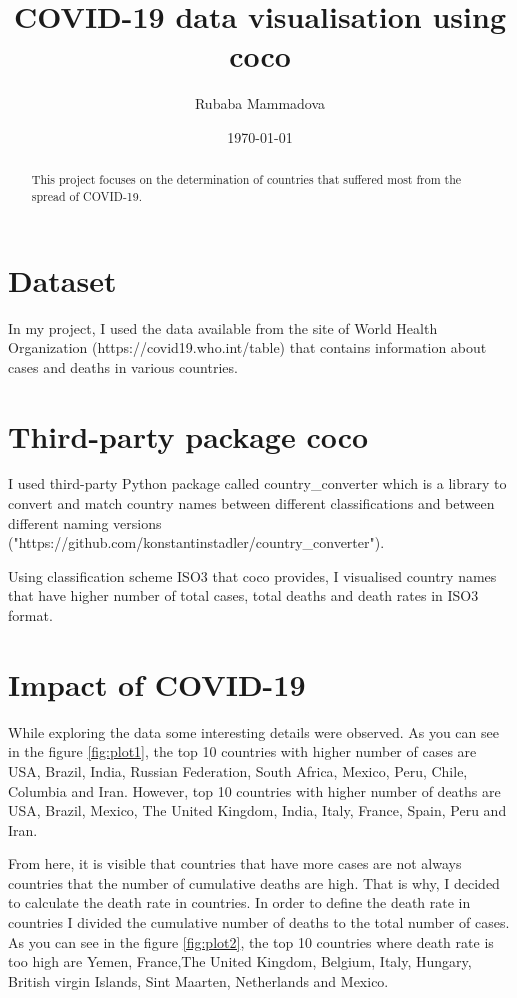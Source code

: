 \documentclass[12pt, letterpaper]{article}
\title{COVID-19 data visualisation using coco}
\author{Rubaba Mammadova}
\date{\today}
\begin{document}
\maketitle

\begin{abstract}
This project focuses on the determination of countries that suffered most from the spread of COVID-19. 
\end{abstract}

\section{Dataset}

In my project, I used the data available from the site of World Health Organization (https://covid19.who.int/table) that contains information about cases and deaths in various countries.

\section{Third-party package coco}

I used third-party Python package called country\_converter which is a library to convert and match country names between different classifications and between different naming versions ("https://github.com/konstantinstadler/country\_converter").

Using classification scheme ISO3 that coco provides, I visualised country names that have higher number of total cases, total deaths and death rates in ISO3 format.
\section{Impact of COVID-19 }

While exploring the data some interesting details were observed. As you can see in the figure \ref{fig:plot1}, the top 10 countries with higher number of cases are USA, Brazil, India, Russian Federation, South Africa, Mexico, Peru, Chile, Columbia and Iran. However, top 10 countries with higher number of deaths are USA, Brazil, Mexico, The United Kingdom, India, Italy, France, Spain, Peru and Iran.

From here, it is visible that countries that have more cases are not always countries that the number of cumulative deaths are high. That is why, I decided to calculate the death rate in countries. In order to define the death rate in countries I divided the cumulative number of deaths to the total number of cases. As you can see in the figure \ref{fig:plot2}, the top 10 countries where death rate is too high are Yemen, France,The United Kingdom, Belgium, Italy, Hungary, British virgin Islands, Sint Maarten, Netherlands and Mexico. 
\end{document}

